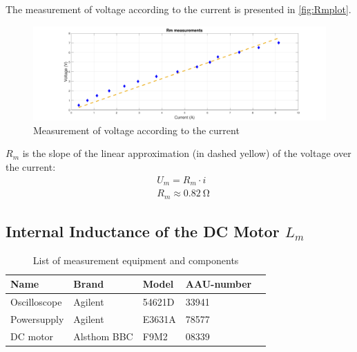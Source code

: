 The measurement of voltage according to the current is presented in \autoref{fig:Rmplot}.
\begin{figure}[htbp]
	\includegraphics[width=1\textwidth]{figures/appendix/Motor&GearTests/plotRm}
	\caption{Measurement of voltage according to the current} \label{fig:Rmplot}
\end{figure}

$R_m$ is the slope of the linear approximation (in dashed yellow) of the voltage over the current: 
\begin{subequations} \label{eq:LaEq}
	\begin{flalign}
		&U_m = R_m \cdot i \\
		&R_m \approx \SI{0.82}{\ohm}
	\end{flalign}
\end{subequations}


\subsection{Internal Inductance of the DC Motor $L_m$}
\begin{table}[htbp]
	\centering
	\caption{List of measurement equipment and components}\label{tab_appendix:LaSetUp}

	\begin{tabularx}{\textwidth}{lXXXX}
		Name 				& Brand	& Model & AAU-number									\\ \toprule \rowcolor{lightGrey}
		Oscilloscope	& Agilent & 54621D & 33941 	\\
		Powersupply	& Agilent & E3631A & 78577\\ \rowcolor{lightGrey}
		DC motor & Alsthom BBC & F9M2& 08339 
	\end{tabularx}
\end{table}
